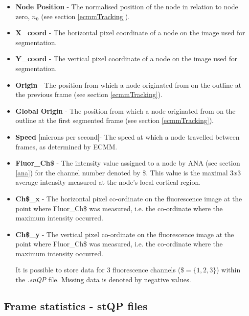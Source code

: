 \documentclass[a4paper,12pt]{article}
\begin{document}
\begin{itemize}

\item \textbf{Node Position} - The normalised position of the node in relation
to node zero, $n_{0}$ (see section \ref{ecmmTracking}).

\item \textbf{X\_coord} - The horizontal pixel coordinate of a node on the image used for segmentation.

\item  \textbf{Y\_coord} - The vertical pixel coordinate of a node on the image used for segmentation.

\item \textbf{Origin} - The position from which a node originated from on the outline
at the previous frame (see section \ref{ecmmTracking}).

\item \textbf{Global Origin} - The position from which a node originated from on the outline
at the first segmented frame (see section \ref{ecmmTracking}).

\item \textbf{Speed} [microns per second]- The speed at which a node travelled between frames, as determined by ECMM.

\item \textbf{Fluor\_Ch\$} - The intensity value assigned to a node by ANA (see section \ref{ana}) for the channel
number denoted by \$.  This value is the maximal $3x3$ average intensity measured at the node's local cortical region.

\item \textbf{Ch\$\_x} - The horizontal pixel co-ordinate on the fluorescence image at the point where Fluor\_Ch\$ was measured, i.e.
the co-ordinate where the maximum intensity occurred.

\item \textbf{Ch\$\_y} - The vertical pixel co-ordinate on the fluorescence image at the point where Fluor\_Ch\$ was measured, i.e.
the co-ordinate where the maximum intensity occurred.

It is possible to store data for 3 fluorescence channels ($\$=\{1,2,3\}$) within the \textit{.snQP} file. Missing 
data is denoted by negative values.

\end{itemize}

\subsection{Frame statistics - stQP files}
\label{stats}
\end{document}
